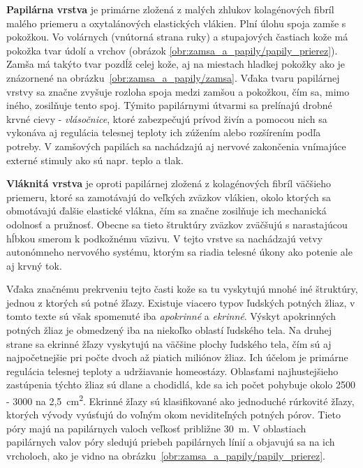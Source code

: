   \textbf{Papilárna vrstva} je primárne zložená z malých zhlukov kolagénových fibríl malého priemeru a oxytalánových elastických vlákien.
  Plní úlohu spoja zamše s pokožkou. Vo volárnych (vnútorná strana ruky) a stupajových častiach kože má pokožka tvar údolí a vrchov
  (obrázok \ref{obr:zamsa_a_papily/papily_prierez}). Zamša má takýto tvar pozdĺž celej kože, aj na miestach hladkej pokožky ako je znázornené na
  obrázku~{\ref{obr:zamsa_a_papily/zamsa}}.
  Vďaka tvaru papilárnej vrstvy sa značne zvyšuje rozloha spoja medzi zamšou a pokožkou, čím sa, mimo iného, zosilňuje tento spoj.
  Týmito papilárnymi útvarmi sa prelínajú drobné krvné cievy - \emph{vlásočnice}, ktoré zabezpečujú prívod živín a pomocou nich sa vykonáva aj regulácia telesnej
  teploty ich zúžením alebo rozšírením podľa potreby. V zamšových papilách sa nachádzajú aj nervové zakončenia vnímajúce externé stimuly ako sú napr. teplo a tlak.

  \textbf{Vláknitá vrstva} je oproti papilárnej zložená z kolagénových fibríl väčšieho priemeru, ktoré sa zamotávajú do veľkých zväzkov vlákien,
  okolo ktorých sa obmotávajú ďalšie elastické vlákna, čím sa značne zosilňuje ich mechanická odolnosť a pružnosť. Obecne sa tieto štruktúry zväzkov zväčšujú
  s narastajúcou hĺbkou smerom k podkožnému väzivu. V tejto vrstve sa nachádzajú vetvy autonómneho nervového systému, ktorým sa riadia telesné úkony ako potenie
  ale aj krvný tok.

  Vďaka značnému prekrveniu tejto časti kože sa tu vyskytujú mnohé iné štruktúry, jednou z ktorých sú potné žľazy. Existuje viacero typov ľudských
  potných žliaz, v tomto texte sú však spomenuté iba \emph{apokrinné} a \emph{ekrinné}. Výskyt apokrinných potných žliaz je obmedzený iba na niekoľko oblastí
  ľudského tela. Na druhej strane sa ekrinné žľazy vyskytujú na väčšine plochy
  ľudského tela, čím sú aj najpočetnejšie pri počte dvoch až piatich miliónov žliaz. Ich účelom je primárne regulácia telesnej teploty a udržiavanie homeostázy.
  Oblasťami najhustejšieho zastúpenia týchto žliaz sú dlane a chodidlá, kde sa ich počet pohybuje okolo 2500 - 3000 na 2,5~cm\textsuperscript{2}.
  Ekrinné žľazy sú klasifikované ako jednoduché rúrkovité žľazy, ktorých vývody vyúsťujú do voľným okom neviditeľných potných pórov. Tieto póry majú
  na papilárnych valoch veľkosť približne 30~{\textmugreek{}}m. V oblastiach papilárnych valov póry sledujú priebeh papilárnych línií a objavujú sa na ich
  vrcholoch, ako je vidno na obrázku~{\ref{obr:zamsa_a_papily/papily_prierez}}.
  
